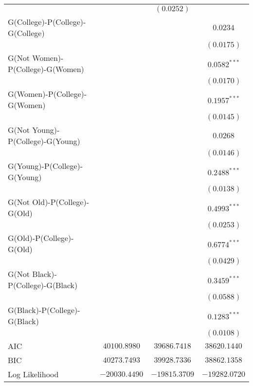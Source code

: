 \begin{center}
\begin{longtable}{l c c c}
                                    &                 & $(0.0252)$      &                 \\
G(College)-P(College)-G(College)    &                 &                 & $0.0234$        \\
                                    &                 &                 & $(0.0175)$      \\
G(Not Women)-P(College)-G(Women)    &                 &                 & $0.0582^{***}$  \\
                                    &                 &                 & $(0.0170)$      \\
G(Women)-P(College)-G(Women)        &                 &                 & $0.1957^{***}$  \\
                                    &                 &                 & $(0.0145)$      \\
G(Not Young)-P(College)-G(Young)    &                 &                 & $0.0268$        \\
                                    &                 &                 & $(0.0146)$      \\
G(Young)-P(College)-G(Young)        &                 &                 & $0.2488^{***}$  \\
                                    &                 &                 & $(0.0138)$      \\
G(Not Old)-P(College)-G(Old)        &                 &                 & $0.4993^{***}$  \\
                                    &                 &                 & $(0.0253)$      \\
G(Old)-P(College)-G(Old)            &                 &                 & $0.6774^{***}$  \\
                                    &                 &                 & $(0.0429)$      \\
G(Not Black)-P(College)-G(Black)    &                 &                 & $0.3459^{***}$  \\
                                    &                 &                 & $(0.0588)$      \\
G(Black)-P(College)-G(Black)        &                 &                 & $0.1283^{***}$  \\
                                    &                 &                 & $(0.0108)$      \\
\midrule
AIC                                 & $40100.8980$    & $39686.7418$    & $38620.1440$    \\
BIC                                 & $40273.7493$    & $39928.7336$    & $38862.1358$    \\
Log Likelihood                      & $-20030.4490$   & $-19815.3709$   & $-19282.0720$   \\
\end{longtable}
\end{center}
